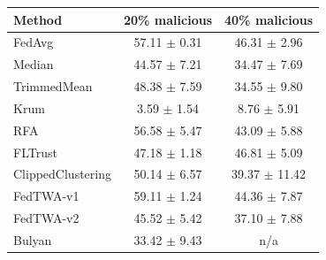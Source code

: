 \begin{tabular}{lcc}
\toprule
Method & 20\% malicious & 40\% malicious \\
\midrule
FedAvg & 57.11 $\pm$ 0.31 & 46.31 $\pm$ 2.96 \\
Median & 44.57 $\pm$ 7.21 & 34.47 $\pm$ 7.69 \\
TrimmedMean & 48.38 $\pm$ 7.59 & 34.55 $\pm$ 9.80 \\
Krum & 3.59 $\pm$ 1.54 & 8.76 $\pm$ 5.91 \\
RFA & 56.58 $\pm$ 5.47 & 43.09 $\pm$ 5.88 \\
FLTrust & 47.18 $\pm$ 1.18 & 46.81 $\pm$ 5.09 \\
ClippedClustering & 50.14 $\pm$ 6.57 & 39.37 $\pm$ 11.42 \\
FedTWA-v1 & 59.11 $\pm$ 1.24 & 44.36 $\pm$ 7.87 \\
FedTWA-v2 & 45.52 $\pm$ 5.42 & 37.10 $\pm$ 7.88 \\
Bulyan & 33.42 $\pm$ 9.43 & n/a \\
\bottomrule
\end{tabular}